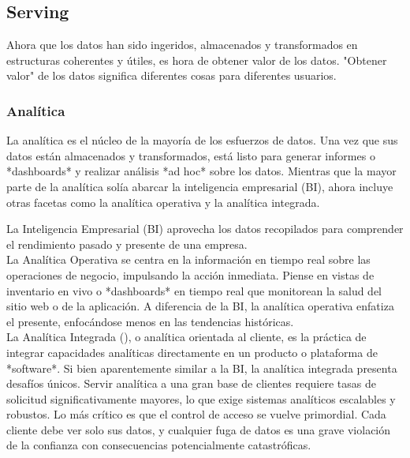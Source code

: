 \documentclass[12pt]{book}
\begin{document}
\subsection{Serving}
Ahora que los datos han sido ingeridos, almacenados y transformados en estructuras coherentes y útiles, es hora de obtener valor de los datos. "Obtener valor" de los datos significa diferentes cosas para diferentes usuarios.

\subsubsection{Analítica}
La analítica es el núcleo de la mayoría de los esfuerzos de datos. Una vez que sus datos están almacenados y transformados, está listo para generar informes o *dashboards* y realizar análisis *ad hoc* sobre los datos. Mientras que la mayor parte de la analítica solía abarcar la inteligencia empresarial (BI), ahora incluye otras facetas como la analítica operativa y la analítica integrada.

La Inteligencia Empresarial (BI) aprovecha los datos recopilados para comprender el rendimiento pasado y presente de una empresa.\\
La Analítica Operativa se centra en la información en tiempo real sobre las operaciones de negocio, impulsando la acción inmediata. Piense en vistas de inventario en vivo o *dashboards* en tiempo real que monitorean la salud del sitio web o de la aplicación. A diferencia de la BI, la analítica operativa enfatiza el presente, enfocándose menos en las tendencias históricas.\\
La Analítica Integrada (), o analítica orientada al cliente, es la práctica de integrar capacidades analíticas directamente en un producto o plataforma de *software*.
Si bien aparentemente similar a la BI, la analítica integrada presenta desafíos únicos. Servir analítica a una gran base de clientes requiere tasas de solicitud significativamente mayores, lo que exige sistemas analíticos escalables y robustos. Lo más crítico es que el control de acceso se vuelve primordial. Cada cliente debe ver solo sus datos, y cualquier fuga de datos es una grave violación de la confianza con consecuencias potencialmente catastróficas.\\
\end{document}
